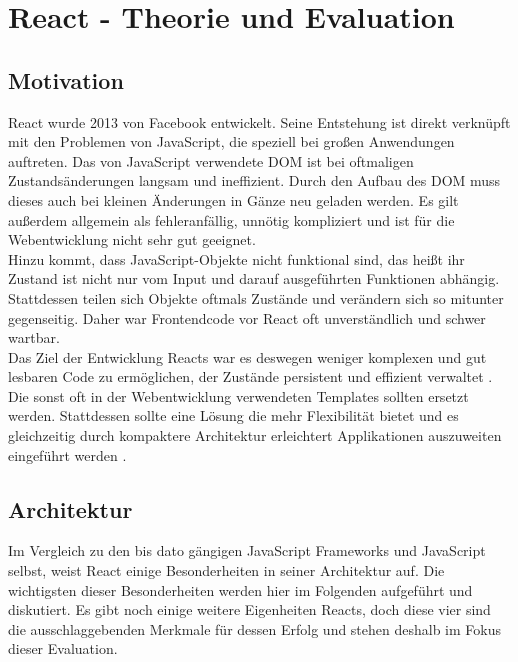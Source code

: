 
\chapter{React - Theorie und Evaluation}
  \label{Evalution React}

\section{Motivation}
React wurde 2013 von Facebook entwickelt. Seine Entstehung ist direkt verknüpft mit den Problemen von JavaScript, die speziell bei großen Anwendungen auftreten. Das von JavaScript verwendete DOM ist bei oftmaligen Zustandsänderungen langsam und ineffizient. Durch den Aufbau des DOM muss dieses auch bei kleinen Änderungen in Gänze neu geladen werden. Es gilt außerdem allgemein als fehleranfällig, unnötig kompliziert und ist für die Webentwicklung nicht sehr gut geeignet. \cite{2}\\
Hinzu kommt, dass JavaScript-Objekte nicht funktional sind, das heißt ihr Zustand ist nicht nur vom Input und darauf ausgeführten Funktionen abhängig. Stattdessen teilen sich Objekte oftmals Zustände und verändern sich so mitunter gegenseitig. Daher war Frontendcode vor React oft unverständlich und schwer wartbar. \cite{2}\\
Das Ziel der Entwicklung Reacts war es deswegen weniger komplexen und gut lesbaren Code zu ermöglichen, der Zustände persistent und effizient verwaltet \cite{3}. Die sonst oft in der Webentwicklung verwendeten Templates sollten ersetzt werden. Stattdessen sollte eine Lösung die mehr Flexibilität bietet und es gleichzeitig durch kompaktere Architektur erleichtert Applikationen auszuweiten eingeführt werden \cite{1}.
\section{Architektur}
Im Vergleich zu den bis dato gängigen JavaScript Frameworks und JavaScript selbst, weist React einige Besonderheiten in seiner Architektur auf. Die wichtigsten dieser Besonderheiten werden hier im Folgenden aufgeführt und diskutiert. Es gibt noch einige weitere Eigenheiten Reacts, doch diese vier sind die ausschlaggebenden Merkmale für dessen Erfolg und stehen deshalb im Fokus dieser Evaluation.
